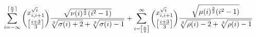 \documentclass{amsart}
\begin{document}
  \[
    \displaystyle \sum_{i=-\infty}^{\lceil \frac{n}{2} \rceil}
                        {\dbinom{x^{{\sqrt{i}}}_{i,i+1}}{\left[\frac{i+3}{3}\right]}}
                        {\frac{\sqrt{\nu (i)^{\frac{\pi}{2}} (i^2-1)}}{\sqrt[3]{\sigma(i)+2} +
                                                                       \sqrt[3]{\sigma(i)-1}}}
    + \displaystyle \sum_{i=\left[\frac{n}{2}\right]}^{\infty}
                        {\dbinom{x^{{\sqrt{i}}}_{i,i+1}}{\left[\frac{i+3}{3}\right]}}
                        {\frac{\sqrt{\mu(i)^{\frac{3}{2}}(i^2-1)}}{\sqrt[3]{\rho(i)-2}+
                                                                  \sqrt[3]{\rho(i)-1}}}
  \]
\end{document}

